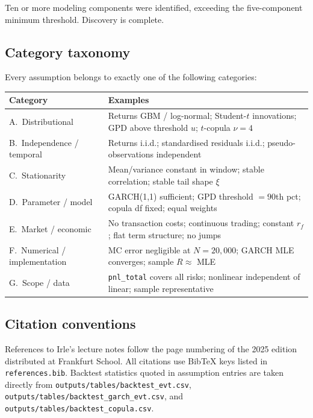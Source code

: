 \documentclass[11pt,a4paper]{article}
\newcommand{\code}[1]{\texttt{#1}}
\begin{document}
\noindent Ten or more modeling components were identified, exceeding the
five-component minimum threshold. Discovery is complete.

\subsection{Category taxonomy}\label{sec:taxonomy}

Every assumption belongs to exactly one of the following categories:

\medskip
\begin{tabular}{@{}p{4cm}p{10.5cm}@{}}
\toprule
\textbf{Category} & \textbf{Examples} \\
\midrule
A.\ Distributional & Returns GBM / log-normal; Student-$t$ innovations;
  GPD above threshold $u$; $t$-copula $\nu=4$ \\[4pt]
B.\ Independence / temporal & Returns i.i.d.; standardised residuals i.i.d.;
  pseudo-observations independent \\[4pt]
C.\ Stationarity & Mean/variance constant in window; stable correlation;
  stable tail shape $\xi$ \\[4pt]
D.\ Parameter / model & GARCH(1,1) sufficient; GPD threshold $= 90$th pct;
  copula df fixed; equal weights \\[4pt]
E.\ Market / economic & No transaction costs; continuous trading; constant
  $r_f$; flat term structure; no jumps \\[4pt]
F.\ Numerical / implementation & MC error negligible at $N{=}20{,}000$;
  GARCH MLE converges; sample $R \approx$ MLE \\[4pt]
G.\ Scope / data & \code{pnl\_total} covers all risks; nonlinear
  independent of linear; sample representative \\
\bottomrule
\end{tabular}

\subsection{Citation conventions}\label{sec:citations}

References to Irle's lecture notes follow the page numbering of the
2025 edition distributed at Frankfurt School. All citations use
BibTeX keys listed in \code{references.bib}. Backtest statistics
quoted in assumption entries are taken directly from
\code{outputs/tables/backtest\_evt.csv},
\code{outputs/tables/backtest\_garch\_evt.csv}, and
\code{outputs/tables/backtest\_copula.csv}.
\end{document}
